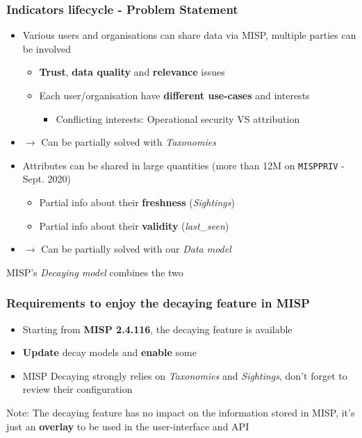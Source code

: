 \begin{frame}
\frametitle{Indicators lifecycle - Problem Statement}
    \begin{itemize}
        \item Various users and organisations can share data via MISP, multiple parties can be involved
        \begin{itemize}
            \item \textbf{Trust}, \textbf{data quality} and \textbf{relevance} issues
            \item Each user/organisation have \textbf{different use-cases} and interests
                \begin{itemize}
                    \item Conflicting interests: Operational security VS attribution 
                \end{itemize}
        \end{itemize}
        \item[] $\rightarrow$ Can be partially solved with \textit{Taxonomies}
        \pause
        \vspace{0.5cm}
    \item Attributes can be shared in large quantities \small{(more than 12M on \texttt{MISPPRIV} - Sept. 2020)}
        \begin{itemize}
            \item Partial info about their \textbf{freshness} (\textit{Sightings})
            \item Partial info about their \textbf{validity} (\textit{last\_seen})
        \end{itemize}
        \item[] $\rightarrow$ Can be partially solved with our \textit{Data model}
    \end{itemize}
    \begin{center}
        MISP's \textit{Decaying model} combines the two
    \end{center}
\end{frame}

\begin{frame}
\frametitle{Requirements to enjoy the decaying feature in MISP}
    \begin{itemize}
        \item Starting from \textbf{MISP 2.4.116}, the decaying feature is available
        \item \textbf{Update} decay models and \textbf{enable} some
        \item MISP Decaying strongly relies on \textit{Taxonomies} and \textit{Sightings}, don't forget to review their configuration
    \end{itemize}
    \vspace{0.7cm}
     Note: The decaying feature has no impact on the information stored in MISP, it's just an \textbf{overlay} to be used in the user-interface and API
\end{frame}

